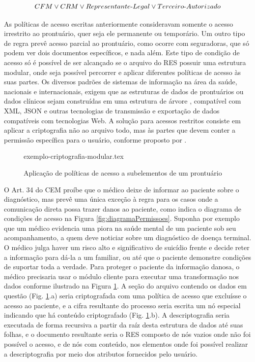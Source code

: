 \documentclass[a4paper,11pt]{article}
\begin{document}
\[ CFM \vee CRM \vee Representante\textnormal{-}Legal \vee Terceiro\textnormal{-}Autorizado \]

As políticas de acesso escritas anteriormente consideravam somente o acesso irrestrito ao prontuário, quer seja ele permanente ou temporário.
Um outro tipo de regra prevê acesso parcial ao prontuário, como ocorre com seguradoras, que só podem ver dois documentos específicos, e nada além.
Este tipo de condição de acesso só é possível de ser alcançado se o arquivo do RES possuir uma estrutura modular, onde seja possível percorrer e aplicar diferentes políticas de acesso às suas partes.
Os diversos padrões de sistemas de informação na área da saúde, nacionais e internacionais, exigem que as estruturas de dados de prontuários ou dados clínicos sejam construídas em uma estrutura de árvore \cite{Munoz2011, Dolin2000, SBIS2016, openEHRFoundation2020}, compatível com XML, JSON e outras tecnologias de transmissão e exportação de dados compatíveis com tecnologias Web.
A solução para acessos restritos consiste em aplicar a criptografia não ao arquivo todo, mas às partes que devem conter a permissão específica para o usuário, conforme proposto por \cite{Akinyele2010}.

\begin{figure}[h]
  \centering
  {exemplo-criptografia-modular.tex}
  \caption{Aplicação de políticas de acesso a subelementos de um prontuário}
  \label{fig:exemplo-criptografia-modular}
\end{figure}

O Art. 34 do CEM proíbe que o médico deixe de informar ao paciente sobre o diagnóstico, mas prevê uma única exceção à regra para os casos onde a comunicação direta possa trazer danos ao paciente, como indica o diagrama de condições de acesso na Figura \ref{fig:diagramaPermissoes}.
Suponha por exemplo que um médico evidencia uma piora na saúde mental de um paciente sob seu acompanhamento, a quem deve noticiar sobre um diagnóstico de doença terminal.
O médico julga haver um risco alto e significativo de suicídio frente e decide reter a informação para dá-la a um familiar, ou até que o paciente demonstre condições de suportar toda a verdade.
Para proteger o paciente da informação danosa, o médico precisaria usar o módulo cliente para executar uma transformação nos dados conforme ilustrado na Figura \ref{fig:exemplo-criptografia-modular}.
A seção do arquivo contendo os dados em questão (Fig. \ref{fig:exemplo-criptografia-modular}.a) seria criptografada com uma política de acesso que excluísse o acesso ao paciente, e a cifra resultante do processo seria escrita um nó especial indicando que há conteúdo criptografado (Fig. \ref{fig:exemplo-criptografia-modular}.b).
A descriptografia seria executada de forma recursiva a partir da raíz desta estrutura de dados até suas folhas, e o documento resultante seria o RES composto de nós vazios onde não foi possível o acesso, e de nós com conteúdo, nos elementos onde foi possível realizar a descriptografia por meio dos atributos fornecidos pelo usuário.
\end{document}
